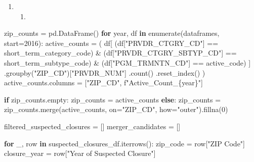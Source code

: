 \documentclass[
  letterpaper,
  DIV=11,
  numbers=noendperiod]{scrartcl}
\newenvironment{Shaded}{\begin{snugshade}}{\end{snugshade}}
\newcommand{\BuiltInTok}[1]{\textcolor[rgb]{0.00,0.23,0.31}{#1}}
\newcommand{\ControlFlowTok}[1]{\textcolor[rgb]{0.00,0.23,0.31}{\textbf{#1}}}
\newcommand{\DecValTok}[1]{\textcolor[rgb]{0.68,0.00,0.00}{#1}}
\newcommand{\KeywordTok}[1]{\textcolor[rgb]{0.00,0.23,0.31}{\textbf{#1}}}
\newcommand{\NormalTok}[1]{\textcolor[rgb]{0.00,0.23,0.31}{#1}}
\newcommand{\OperatorTok}[1]{\textcolor[rgb]{0.37,0.37,0.37}{#1}}
\newcommand{\SpecialCharTok}[1]{\textcolor[rgb]{0.37,0.37,0.37}{#1}}
\newcommand{\SpecialStringTok}[1]{\textcolor[rgb]{0.13,0.47,0.30}{#1}}
\newcommand{\StringTok}[1]{\textcolor[rgb]{0.13,0.47,0.30}{#1}}
\providecommand{\tightlist}{%
  \setlength{\itemsep}{0pt}\setlength{\parskip}{0pt}}\usepackage{longtable,booktabs,array}
\begin{document}
\begin{enumerate}
\def\labelenumi{\arabic{enumi}.}
\setcounter{enumi}{2}
\tightlist
\item
  \begin{enumerate}
  \def\labelenumii{\alph{enumii}.}
  \tightlist
  \item
  \end{enumerate}
\end{enumerate}

\begin{Shaded}
\begin{Highlighting}[]
\NormalTok{zip\_counts }\OperatorTok{=}\NormalTok{ pd.DataFrame()}
\ControlFlowTok{for}\NormalTok{ year, df }\KeywordTok{in} \BuiltInTok{enumerate}\NormalTok{(dataframes, start}\OperatorTok{=}\DecValTok{2016}\NormalTok{):}
\NormalTok{    active\_counts }\OperatorTok{=}\NormalTok{ (}
\NormalTok{        df[}
\NormalTok{            (df[}\StringTok{"PRVDR\_CTGRY\_CD"}\NormalTok{] }\OperatorTok{==}\NormalTok{ short\_term\_category\_code)}
            \OperatorTok{\&}\NormalTok{ (df[}\StringTok{"PRVDR\_CTGRY\_SBTYP\_CD"}\NormalTok{] }\OperatorTok{==}\NormalTok{ short\_term\_subtype\_code)}
            \OperatorTok{\&}\NormalTok{ (df[}\StringTok{"PGM\_TRMNTN\_CD"}\NormalTok{] }\OperatorTok{==}\NormalTok{ active\_code)}
\NormalTok{        ]}
\NormalTok{        .groupby(}\StringTok{"ZIP\_CD"}\NormalTok{)[}\StringTok{"PRVDR\_NUM"}\NormalTok{]}
\NormalTok{        .count()}
\NormalTok{        .reset\_index()}
\NormalTok{    )}
\NormalTok{    active\_counts.columns }\OperatorTok{=}\NormalTok{ [}\StringTok{"ZIP\_CD"}\NormalTok{, }\SpecialStringTok{f"Active\_Count\_}\SpecialCharTok{\{}\NormalTok{year}\SpecialCharTok{\}}\SpecialStringTok{"}\NormalTok{]}

    \ControlFlowTok{if}\NormalTok{ zip\_counts.empty:}
\NormalTok{        zip\_counts }\OperatorTok{=}\NormalTok{ active\_counts}
    \ControlFlowTok{else}\NormalTok{:}
\NormalTok{        zip\_counts }\OperatorTok{=}\NormalTok{ zip\_counts.merge(active\_counts, on}\OperatorTok{=}\StringTok{"ZIP\_CD"}\NormalTok{, how}\OperatorTok{=}\StringTok{"outer"}\NormalTok{).fillna(}\DecValTok{0}\NormalTok{)}

\NormalTok{filtered\_suspected\_closures }\OperatorTok{=}\NormalTok{ []}
\NormalTok{merger\_candidates }\OperatorTok{=}\NormalTok{ []}

\ControlFlowTok{for}\NormalTok{ \_, row }\KeywordTok{in}\NormalTok{ suspected\_closures\_df.iterrows():}
\NormalTok{    zip\_code }\OperatorTok{=}\NormalTok{ row[}\StringTok{"ZIP Code"}\NormalTok{]}
\NormalTok{    closure\_year }\OperatorTok{=}\NormalTok{ row[}\StringTok{"Year of Suspected Closure"}\NormalTok{]}


\end{Highlighting}
\end{Shaded}
\end{document}
